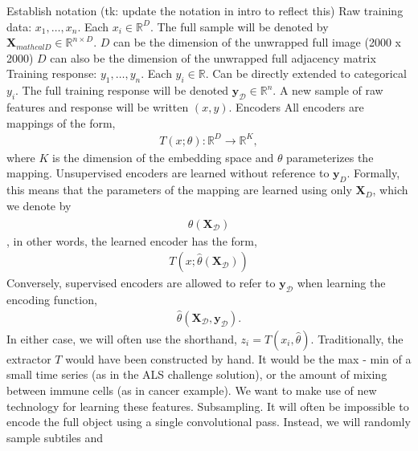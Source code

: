 \documentclass[11pt]{article}
\begin{document}
\begin{outline}
\1 Establish notation (tk: update the notation in intro to reflect this)
  \2 Raw training data: $x_{1}, \dots, x_{n}$. Each $x_{i} \in \mathbb{R}^{D}$.
  The full sample will be denoted by $\mathbf{X}_{mathcal{D}} \in \mathbb{R}^{n
    \times D}$.
    \3 $D$ can be the dimension of the unwrapped full image (2000 x 2000)
    \3 $D$ can also be the dimension of the unwrapped full adjacency matrix
  \2 Training response: $y_{1}, \dots, y_{n}$. Each $y_{i} \in \mathbb{R}$. Can
  be directly extended to categorical $y_{i}$. The full training response will
  be denoted $\mathbf{y}_{\mathcal{D}} \in \mathbb{R}^{n}$.
  \2 A new sample of raw features and response will be written $\left(x,
  y\right)$.
  \3 Encoders
    \4 All encoders are mappings of the form,
      \begin{align}
        T\left(x; \theta\right): \mathbb{R}^D \to \mathbb{R}^{K},
      \end{align}
      where $K$ is the dimension of the embedding space and $\theta$
      parameterizes the mapping.
    \4 Unsupervised encoders are learned without reference to $\mathbf{y}_{D}$.
    Formally, this means that the parameters of the mapping are learned using
    only $\mathbf{X}_{D}$, which we denote by
    \begin{align}
      \hat{\theta}\left(\mathbf{X}_{\mathcal{D}}\right)
    \end{align},
    in other words, the learned encoder has the form,
    \begin{align}
      T\left(x; \hat{\theta}\left(\mathbf{X}_{\mathcal{D}}\right)\right)
    \end{align}
    \4 Conversely, supervised encoders are allowed to refer to
    $\mathbf{y}_{\mathcal{D}}$ when learning the encoding function,
    \begin{align}
      \hat{\theta}\left(\mathbf{X}_{\mathcal{D}}, \mathbf{y}_{\mathcal{D}}\right).
    \end{align}
    \4 In either case, we will often use the shorthand, $z_{i} = T\left(x_{i},
    \hat{\theta}\right)$.
    \4 Traditionally, the extractor $T$ would have been constructed by hand. It
    would be the max - min of a small time series (as in the ALS challenge
    solution), or the amount of mixing between immune cells (as in cancer
    example). We want to make use of new technology for learning these features.
    \4 Subsampling. It will often be impossible to encode the full object using
    a single convolutional pass. Instead, we will randomly sample subtiles and

\end{outline}
\end{document}
